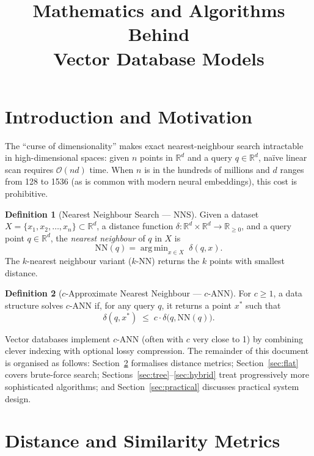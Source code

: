 \documentclass[11pt,a4paper]{article}
\title{
  \vspace{-1cm}
  \textbf{\LARGE Mathematics and Algorithms Behind\\[4pt]
  Vector Database Models}\\[10pt]
}
\theoremstyle{definition}
\newtheorem{definition}{Definition}[section]
\newcommand{\R}{\mathbb{R}}
\newcommand{\calO}{\mathcal{O}}
\newcommand{\argmin}{\operatorname{arg\,min}}
\begin{document}
\maketitle
\thispagestyle{empty}


\section{Introduction and Motivation}

The ``curse of dimensionality'' makes exact nearest-neighbour search
intractable in high-dimensional spaces: given $n$ points in $\R^d$ and a
query $q\in\R^d$, na\"ive linear scan requires $\calO(nd)$ time.  When
$n$ is in the hundreds of millions and $d$ ranges from 128 to 1536 (as
is common with modern neural embeddings), this cost is prohibitive.

\begin{definition}[Nearest Neighbour Search --- NNS]
Given a dataset $X = \{x_1, x_2, \ldots, x_n\} \subset \R^d$, a
distance function $\delta: \R^d \times \R^d \to \R_{\geq 0}$, and a
query point $q \in \R^d$, the \emph{nearest neighbour} of $q$ in $X$ is
\[
  \mathrm{NN}(q) = \argmin_{x \in X}\; \delta(q, x).
\]
The $k$-nearest neighbour variant ($k$-NN) returns the $k$ points with
smallest distance.
\end{definition}

\begin{definition}[$c$-Approximate Nearest Neighbour --- $c$-ANN]
For $c \geq 1$, a data structure solves $c$-ANN if, for any query $q$,
it returns a point $x^*$ such that
\[
  \delta(q, x^*) \;\leq\; c \cdot \delta\bigl(q, \mathrm{NN}(q)\bigr).
\]
\end{definition}

Vector databases implement $c$-ANN (often with $c$ very close to 1) by
combining clever indexing with optional lossy compression.  The remainder
of this document is organised as follows: Section~\ref{sec:metrics}
formalises distance metrics; Section~\ref{sec:flat} covers brute-force
search; Sections~\ref{sec:tree}--\ref{sec:hybrid} treat progressively
more sophisticated algorithms; and Section~\ref{sec:practical} discusses
practical system design.


\section{Distance and Similarity Metrics}\label{sec:metrics}
\end{document}
